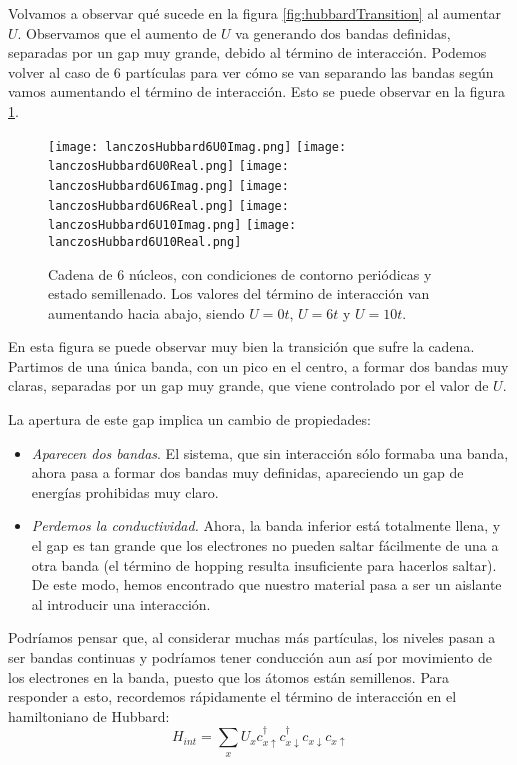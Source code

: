 \documentclass[12pt,twoside]{article}
\begin{document}
Volvamos a observar qué sucede en la figura \ref{fig:hubbardTransition} al aumentar $U$. Observamos que el aumento de $U$ va generando dos bandas definidas, separadas por un gap muy grande, debido al término de interacción. Podemos volver al caso de 6 partículas para ver cómo se van separando las bandas según vamos aumentando el término de interacción. Esto se puede observar en la figura \ref{fig:hubbardTransition6}.
\begin{figure}[h!]
  \begin{center}
    \texttt{[image: lanczosHubbard6U0Imag.png]}
    \texttt{[image: lanczosHubbard6U0Real.png]}
    \texttt{[image: lanczosHubbard6U6Imag.png]}
    \texttt{[image: lanczosHubbard6U6Real.png]}
    \texttt{[image: lanczosHubbard6U10Imag.png]}
    \texttt{[image: lanczosHubbard6U10Real.png]}
  \end{center}
  \caption{Cadena de 6 núcleos, con condiciones de contorno periódicas y estado semillenado. Los valores del término de interacción van aumentando hacia abajo, siendo $U = 0t$, $U = 6t$ y $U = 10t$.}
  \label{fig:hubbardTransition6}
\end{figure}

En esta figura se puede observar muy bien la transición que sufre la cadena. Partimos de una única banda, con un pico en el centro, a formar dos bandas muy claras, separadas por un gap muy grande, que viene controlado por el valor de $U$.

La apertura de este gap implica un cambio de propiedades:
\begin{itemize}
  \item \textit{Aparecen dos bandas}. El sistema, que sin interacción sólo formaba una banda, ahora pasa a formar dos bandas muy definidas, apareciendo un gap de energías prohibidas muy claro.
  \item \textit{Perdemos la conductividad.} Ahora, la banda inferior está totalmente llena, y el gap es tan grande que los electrones no pueden saltar fácilmente de una a otra banda (el término de hopping resulta insuficiente para hacerlos saltar). De este modo, hemos encontrado que nuestro material pasa a ser un aislante al introducir una interacción.
\end{itemize}

Podríamos pensar que, al considerar muchas más partículas, los niveles pasan a ser bandas continuas y podríamos tener conducción aun así por movimiento de los electrones en la banda, puesto que los átomos están semillenos. Para responder a esto, recordemos rápidamente el término de interacción en el hamiltoniano de Hubbard:
$$
H_{int} = \sum_x U_x c^{\dagger}_{x\uparrow}c^{\dagger}_{x\downarrow}c_{x\downarrow}c_{x\uparrow}
$$
\end{document}
